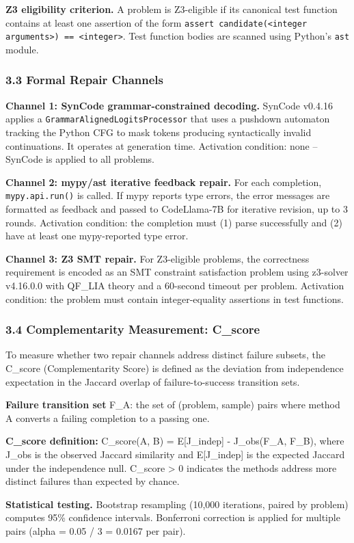 \textbf{Z3 eligibility criterion.} A problem is Z3-eligible if its canonical test function contains at least one assertion of the form \texttt{assert candidate(<integer arguments>) == <integer>}. Test function bodies are scanned using Python's \texttt{ast} module.

\subsubsection{3.3 Formal Repair Channels}

\textbf{Channel 1: SynCode grammar-constrained decoding.} SynCode v0.4.16 applies a \texttt{GrammarAlignedLogitsProcessor} that uses a pushdown automaton tracking the Python CFG to mask tokens producing syntactically invalid continuations. It operates at generation time. Activation condition: none -- SynCode is applied to all problems.

\textbf{Channel 2: mypy/ast iterative feedback repair.} For each completion, \texttt{mypy.api.run()} is called. If mypy reports type errors, the error messages are formatted as feedback and passed to CodeLlama-7B for iterative revision, up to 3 rounds. Activation condition: the completion must (1) parse successfully and (2) have at least one mypy-reported type error.

\textbf{Channel 3: Z3 SMT repair.} For Z3-eligible problems, the correctness requirement is encoded as an SMT constraint satisfaction problem using z3-solver v4.16.0.0 with QF_LIA theory and a 60-second timeout per problem. Activation condition: the problem must contain integer-equality assertions in test functions.

\subsubsection{3.4 Complementarity Measurement: C_score}

To measure whether two repair channels address distinct failure subsets, the C_score (Complementarity Score) is defined as the deviation from independence expectation in the Jaccard overlap of failure-to-success transition sets.

\textbf{Failure transition set} F_A: the set of (problem, sample) pairs where method A converts a failing completion to a passing one.

\textbf{C_score definition:} C_score(A, B) = E[J_indep] - J_obs(F_A, F_B), where J_obs is the observed Jaccard similarity and E[J_indep] is the expected Jaccard under the independence null. C_score > 0 indicates the methods address more distinct failures than expected by chance.

\textbf{Statistical testing.} Bootstrap resampling (10,000 iterations, paired by problem) computes 95\% confidence intervals. Bonferroni correction is applied for multiple pairs (alpha = 0.05 / 3 = 0.0167 per pair).
